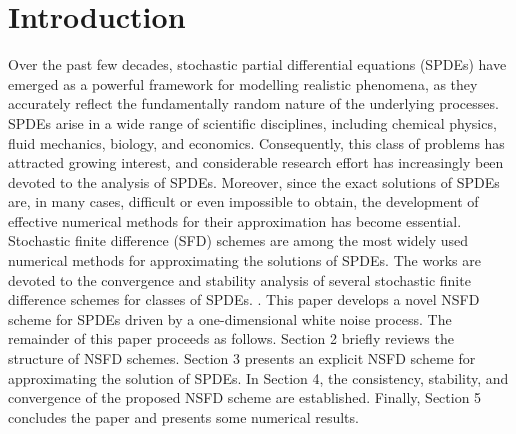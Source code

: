 \documentclass[twoside]{article}
\begin{document}
\section{Introduction}
\raggedbottom
\allowdisplaybreaks
Over the past few decades, stochastic partial differential equations (SPDEs)
have emerged as a powerful framework for modelling realistic phenomena, as
they accurately reflect the fundamentally random nature of the underlying
processes. SPDEs arise in a wide range of scientific disciplines, including
chemical physics, fluid mechanics, biology, and economics. Consequently, this
class of problems has attracted growing interest, and considerable research
effort has increasingly been devoted to the analysis of SPDEs. Moreover, since
the exact solutions of SPDEs are, in many cases, difficult or even impossible
to obtain, the development of effective numerical methods for their
approximation has become essential. Stochastic finite difference (SFD) schemes are among the most widely used numerical methods for approximating the solutions of SPDEs. The works \cite{Namjoo:etal:2024, Baleanu:etal:2023, Karami:etal:2023, Namjoo:Mohebbian:2016, Namjoo:Mohebbian:2019} are devoted to the convergence and stability analysis of several stochastic finite difference schemes for classes of SPDEs.
. This paper develops a novel NSFD scheme for SPDEs driven by a one-dimensional white noise process. The remainder of this paper proceeds as follows.  Section 2
briefly reviews the structure of NSFD schemes. Section 3 presents an
explicit NSFD scheme for approximating the solution of SPDEs. In
Section 4, the consistency, stability, and convergence of the
proposed NSFD scheme are established. Finally, Section 5 concludes the paper and presents some numerical results.
\end{document}
